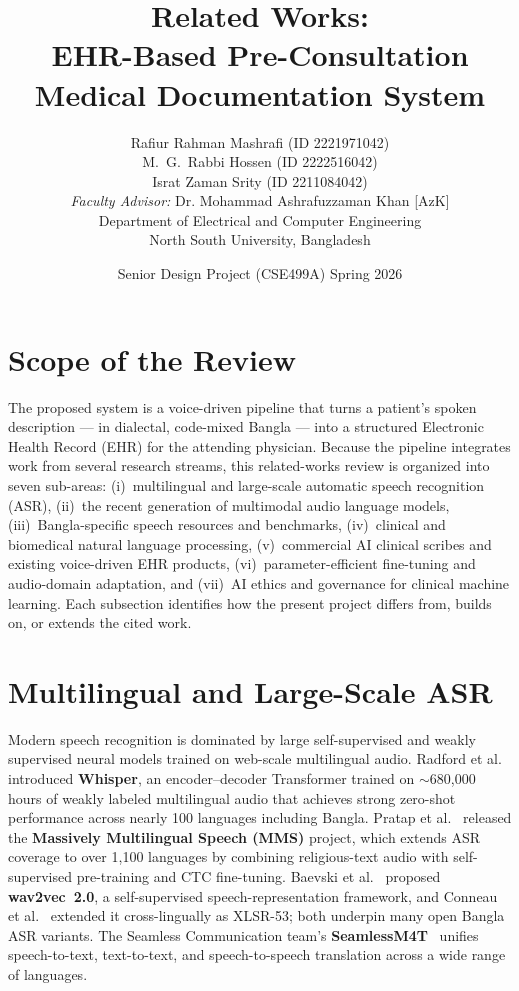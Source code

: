\documentclass[12pt,a4paper]{article}
\title{\bfseries Related Works:\\
EHR-Based Pre-Consultation Medical Documentation System}
\author{Rafiur Rahman Mashrafi (ID 2221971042)\\
        M.~G.~Rabbi Hossen (ID 2222516042)\\
        Israt Zaman Srity (ID 2211084042)\\[6pt]
        \emph{Faculty Advisor:} Dr. Mohammad Ashrafuzzaman Khan [AzK]\\
        Department of Electrical and Computer Engineering\\
        North South University, Bangladesh}
\date{Senior Design Project (CSE499A) \quad Spring 2026}
\begin{document}
\maketitle

\section{Scope of the Review}

The proposed system is a voice-driven pipeline that turns a
patient's spoken description --- in dialectal, code-mixed Bangla
--- into a structured Electronic Health Record (EHR) for the
attending physician. Because the pipeline integrates work from
several research streams, this related-works review is organized
into seven sub-areas: (i)~multilingual and large-scale automatic
speech recognition (ASR), (ii)~the recent generation of multimodal
audio language models, (iii)~Bangla-specific speech resources and
benchmarks, (iv)~clinical and biomedical natural language
processing, (v)~commercial AI clinical scribes and existing
voice-driven EHR products, (vi)~parameter-efficient fine-tuning
and audio-domain adaptation, and (vii)~AI ethics and governance for
clinical machine learning. Each subsection identifies how the
present project differs from, builds on, or extends the cited work.

\section{Multilingual and Large-Scale ASR}

Modern speech recognition is dominated by large self-supervised and
weakly supervised neural models trained on web-scale multilingual
audio. Radford et al.~\cite{rw:whisper} introduced
\textbf{Whisper}, an encoder--decoder Transformer trained on
$\sim$680{,}000 hours of weakly labeled multilingual audio that
achieves strong zero-shot performance across nearly 100 languages
including Bangla. Pratap et al.~\cite{rw:mms} released the
\textbf{Massively Multilingual Speech (MMS)} project, which extends
ASR coverage to over 1{,}100 languages by combining religious-text
audio with self-supervised pre-training and CTC fine-tuning. Baevski
et al.~\cite{rw:wav2vec2} proposed \textbf{wav2vec~2.0}, a
self-supervised speech-representation framework, and Conneau et
al.~\cite{rw:xlsr} extended it cross-lingually as XLSR-53;
both underpin many open Bangla ASR variants. The Seamless
Communication team's \textbf{SeamlessM4T}~\cite{rw:seamless}
unifies speech-to-text, text-to-text, and speech-to-speech
translation across a wide range of languages.
\end{document}
